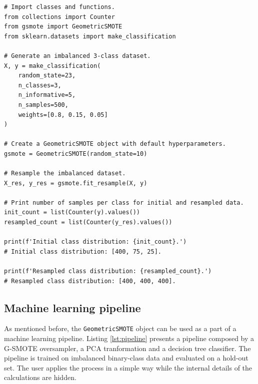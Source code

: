 \documentclass[preprint,12pt, a4paper]{elsarticle}
\begin{document}
\begin{lstlisting}[caption={Resampling of imbalanced data using the \texttt{fit\_resample} method.},label={lst:basic}]
# Import classes and functions.
from collections import Counter
from gsmote import GeometricSMOTE
from sklearn.datasets import make_classification

# Generate an imbalanced 3-class dataset.
X, y = make_classification(
    random_state=23, 
    n_classes=3, 
    n_informative=5,
    n_samples=500,
    weights=[0.8, 0.15, 0.05]
)

# Create a GeometricSMOTE object with default hyperparameters.
gsmote = GeometricSMOTE(random_state=10)

# Resample the imbalanced dataset.
X_res, y_res = gsmote.fit_resample(X, y) 

# Print number of samples per class for initial and resampled data. 
init_count = list(Counter(y).values())
resampled_count = list(Counter(y_res).values())

print(f'Initial class distribution: {init_count}.') 
# Initial class distribution: [400, 75, 25].

print(f'Resampled class distribution: {resampled_count}.')
# Resampled class distribution: [400, 400, 400].
\end{lstlisting}

\subsection{Machine learning pipeline}

As mentioned before, the \texttt{GeometricSMOTE} object can be used as a part of a machine learning pipeline. Listing \ref{lst:pipeline} presents a pipeline composed by a G-SMOTE oversampler, a PCA tranformation and a decision tree classifier. The pipeline is trained on imbalanced binary-class data and evaluated on a hold-out set. The user applies the process in a simple way while the internal details of the calculations are hidden.
\end{document}
